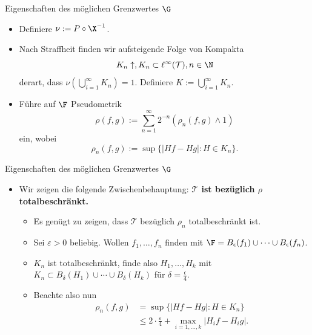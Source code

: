 \begin{frame}{Eigenschaften des möglichen Grenzwertes $\G$}
    \begin{proofs}[\proofname.]
        \begin{itemize}
            \item Definiere $\nu := P \circ \X^{-1}$.
            \item Nach Straffheit finden wir aufsteigende Folge von Kompakta \[K_n \uparrow, K_n \subset \ell^\infty(\mathcal{T}), n \in \N\] derart, dass $\nu(\bigcup_{i=1}^\infty K_n) = 1$. Definiere $K := \bigcup_{i=1}^\infty K_n$. 
            \pause
            \item Führe auf $\F$ Pseudometrik \[
\rho(f,g) := \sum_{n=1}^\infty 2^{-n} (\rho_n(f,g) \wedge 1)
            \] ein, wobei \[
\rho_n(f,g) := \sup \{|Hf - Hg| : H \in K_n\}.
            \]
        \end{itemize}
    \end{proofs}
\end{frame}
\begin{frame}{Eigenschaften des möglichen Grenzwertes $\G$}
    \begin{proofs}
    \begin{itemize}
        \item Wir zeigen die folgende Zwischenbehauptung: \textbf{$\mathcal{T}$ ist bezüglich $\rho$ totalbeschränkt.}
        \pause
        \begin{itemize}
            \item Es genügt zu zeigen, dass $\mathcal{T}$ bezüglich $\rho_n$ totalbeschränkt ist.
            \item Sei $\varepsilon > 0$ beliebig. Wollen $f_1, \ldots, f_n$ finden mit $\F = B_\epsilon(f_1) \cup \cdots \cup B_\epsilon(f_n)$.
            \pause
            \item $K_n$ ist totalbeschränkt, finde also $H_1, \ldots, H_k$ mit $K_n \subset B_\delta(H_1) \cup \cdots \cup B_\delta(H_k)$ für $\delta = \frac{\epsilon}{4}$.
            \pause
            \item Beachte also nun \begin{align*}
               \rho_n(f,g) &= \sup \{|Hf-Hg|: H \in K_n\} \\
               &\leq 2 \cdot \frac{\varepsilon}{4} + \max_{i=1, \ldots, k} |H_if - H_ig|.
            \end{align*}
        \end{itemize} 
    \end{itemize}
    \end{proofs}
\end{frame}

